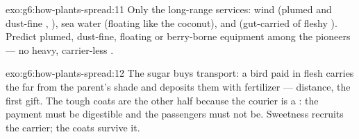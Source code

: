 \begin{solution}{exo:g6:how-plants-spread:11}
Only the long-range services: wind (plumed and dust-fine
, ), sea water (floating  like the coconut),
and  (gut-carried  of fleshy ). Predict
plumed, dust-fine, floating or berry-borne equipment among
the pioneers --- no heavy, carrier-less .
\end{solution}

\begin{solution}{exo:g6:how-plants-spread:12}
The sugar buys transport: a bird paid in flesh carries the
 far from the parent's shade and deposits them with
fertilizer --- distance, the first gift. The tough coats are
the other half because the courier is a : the
payment must be digestible and the passengers must not be.
Sweetness recruits the carrier; the coats survive it.
\end{solution}

